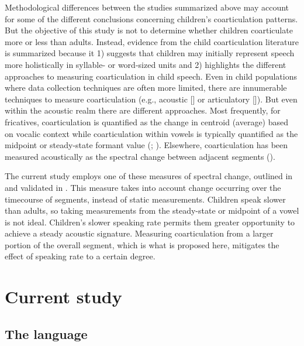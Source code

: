 \documentclass[a4paper,man,floatsintext,natbib,donotrepeattitle, apacite]{apa6}
\begin{document}
Methodological differences between the studies summarized above may account for some of the different conclusions concerning children's coarticulation patterns. But the objective of this study is not to determine whether children coarticulate more or less than adults. Instead, evidence from the child coarticulation literature is summarized because it 1) suggests that children may initially represent speech more holistically in syllable- or word-sized units and 2) highlights the different approaches to measuring coarticulation in child speech. Even in child populations where data collection techniques are often more limited, there are innumerable techniques to measure coarticulation (e.g., acoustic [\citealt{nittrouerHowChildrenLearn1996}] or articulatory [\citealt{zharkovaSpatialTemporalLingual2014}]). But even within the acoustic realm there are different approaches. Most frequently, for fricatives, coarticulation is quantified as the change in centroid (average) based on vocalic context while coarticulation within vowels is typically quantified as the midpoint or steady-state formant value (\citealt{nittrouerEmergencePhoneticSegments1989}; \citealt{nittrouerHowChildrenLearn1996}). Elsewhere, coarticulation has been measured acoustically as the spectral change between adjacent segments (\citealt{gerosaAnalyzingChildrenSpeech2006}).

The current study employs one of these measures of spectral change, outlined in \citet{gerosaAnalyzingChildrenSpeech2006} and validated in \citet{cychoszSpectralTemporalMeasures2019}. This measure takes into account change occurring over the timecourse of segments, instead of static measurements. Children speak slower than adults, so taking measurements from the steady-state or midpoint of a vowel is not ideal. Children's slower speaking rate permits them greater opportunity to achieve a steady acoustic signature. Measuring coarticulation from a larger portion of the overall segment, which is what is proposed here, mitigates the effect of speaking rate to a certain degree.

\section{Current study}

\subsection{The language}\label{the-language}
\end{document}
